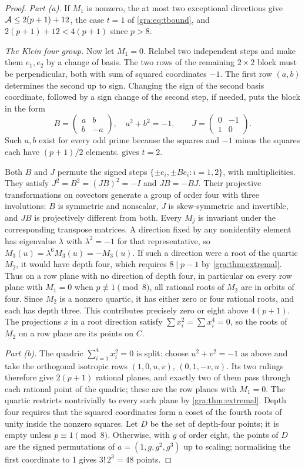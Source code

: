 \begin{proof}
\emph{Part \textup{(a)}.} If $M_1$ is nonzero, the at most two exceptional
directions give $\mathcal{A}\le2(p+1)+12$, the case $t=1$ of
\eqref{gra:eq:tbound}, and $2(p+1)+12<4(p+1)$ since $p>8$.

\emph{The Klein four group.} Now let $M_1=0$. Relabel two independent steps
and make them $e_1,e_2$ by a change of basis. The two rows of the remaining
$2\times2$ block must be perpendicular, both with sum of squared
coordinates $-1$. The first row $(a,b)$ determines the second up to sign.
Changing the sign of the second basis coordinate, followed by a sign change
of the second step, if needed, puts the block in the form
\[
 B=\begin{pmatrix}a&b\\b&-a\end{pmatrix},\quad a^2+b^2=-1,\qquad
 J=\begin{pmatrix}0&-1\\1&0\end{pmatrix}.
\]
Such $a,b$ exist for every odd prime because the squares and $-1$ minus
the squares each have $(p+1)/2$ elements.  gives
$t=2$.

Both $B$ and $J$ permute the signed steps
$\{\pm e_i,\pm Be_i:i=1,2\}$, with multiplicities. They satisfy
$J^2=B^2=(JB)^2=-I$ and $JB=-BJ$. Their projective transformations on
covectors generate a group of order four with three involutions: $B$ is
symmetric and nonscalar, $J$ is skew-symmetric and invertible, and $JB$ is
projectively different from both. Every $M_j$ is invariant under the
corresponding transpose matrices. A direction fixed by any nonidentity
element has eigenvalue $\lambda$ with $\lambda^2=-1$ for that
representative, so $M_3(u)=\lambda^6M_3(u)=-M_3(u)$. If such a direction
were a root of the quartic $M_2$, it would have depth four, which requires
$8\mid p-1$ by \cref{gra:thm:extremal}. Thus on a row plane with no
direction of depth four, in particular on every row plane with $M_1=0$ when
$p\not\equiv1\pmod8$, all rational roots of $M_2$ are in orbits of four.
Since $M_2$ is a nonzero quartic, it has either zero or four rational
roots, and each has depth three. This contributes precisely zero or eight
above $4(p+1)$. The projections $x$ in a root direction satisfy
$\sum x_i^2=\sum x_i^4=0$, so the roots of $M_2$ on a row plane are its
points on $C$.

\emph{Part \textup{(b)}.} The quadric $\sum_{i=1}^4x_i^2=0$ is split:
choose $u^2+v^2=-1$ as above and take the orthogonal isotropic rows
$(1,0,u,v)$, $(0,1,-v,u)$. Its two rulings therefore give $2(p+1)$
rational planes, and exactly two of them pass through each rational point
of the quadric; these are the row planes with $M_1=0$. The quartic
restricts nontrivially to every such plane by \cref{gra:thm:extremal}.
Depth four requires that the squared coordinates form a coset of the fourth
roots of unity inside the nonzero squares. Let $D$ be the set of depth-four
points; it is empty unless $p\equiv1\pmod8$. Otherwise, with $g$ of order
eight, the points of $D$ are the signed permutations of $a=(1,g,g^2,g^3)$
up to scaling; normalising the first coordinate to $1$ gives
$3!\,2^3=48$ points.


\end{proof}
